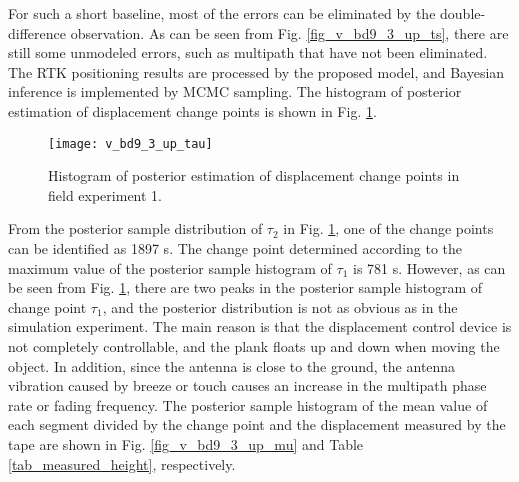 \documentclass{svjour3}                     %
\begin{document}
For such a short baseline, most of the errors can be eliminated by the double-difference observation. As can be seen from Fig. \ref{fig_v_bd9_3_up_ts}, there are still some unmodeled errors, such as multipath that have not been eliminated. The RTK positioning results are processed by the proposed model, and Bayesian inference is implemented by MCMC sampling. The histogram of posterior estimation of displacement change points is shown in Fig. \ref{fig_v_bd9_3_up_tau}.

\begin{figure}[htbp]
	\centering
	\texttt{[image: v\_bd9\_3\_up\_tau]}
	\caption{Histogram of posterior estimation of displacement change points in field experiment 1.}
	\label{fig_v_bd9_3_up_tau}
\end{figure} 
From the posterior sample distribution of $\tau_2$ in Fig. \ref{fig_v_bd9_3_up_tau}, one of the change points can be identified as 1897 s. The change point determined according to the maximum value of the posterior sample histogram of $\tau_1$ is 781 s.
However, as can be seen from Fig. \ref{fig_v_bd9_3_up_tau}, there are two peaks in the posterior sample histogram of change point $\tau_1$, and the posterior distribution is not as obvious as in the simulation experiment.
The main reason is that the displacement control device is not completely controllable, and the plank floats up and down when moving the object. 
In addition, since the antenna is close to the ground, the antenna vibration caused by breeze or touch causes an increase in the multipath phase rate or fading frequency\citep{teunissen2017springer}. 
The posterior sample histogram of the mean value of each segment divided by the change point and the displacement measured by the tape are shown in Fig. \ref{fig_v_bd9_3_up_mu} and Table \ref{tab_measured_height}, respectively.
\end{document}
